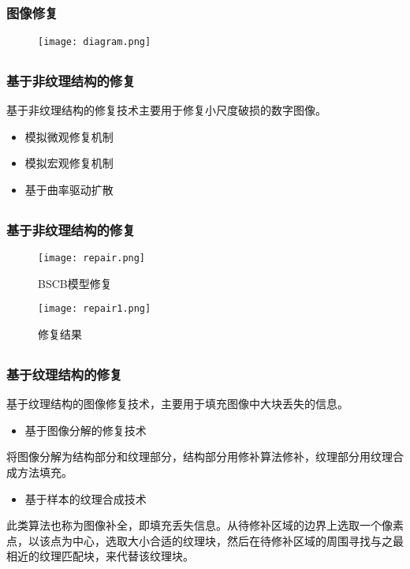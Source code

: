 \documentclass[notheorems,mathserif,table,compress]{beamer}  %
\begin{document}
\subsection{}
\begin{frame}
   \frametitle{图像修复}
   \begin{figure}[!ht]
   \centering
   \texttt{[image: diagram.png]}
   \end{figure}
\end{frame}

\subsection{}
\begin{frame}
   \frametitle{基于非纹理结构的修复}
   基于非纹理结构的修复技术主要用于修复小尺度破损的数字图像。 \\
   \begin{itemize}
   \item 模拟微观修复机制
   \item 模拟宏观修复机制
   \item 基于曲率驱动扩散
   \end{itemize}
\end{frame}

\subsection{}
\begin{frame}
   \frametitle{基于非纹理结构的修复}
   \begin{figure}
   \centering
   \texttt{[image: repair.png]}
   \caption{BSCB模型修复}
   \end{figure}
   \begin{figure}
   \centering
   \texttt{[image: repair1.png]}
   \caption{修复结果}
   \end{figure}   
\end{frame}

\subsection{}
\begin{frame}
   \frametitle{基于纹理结构的修复}
   基于纹理结构的图像修复技术，主要用于填充图像中大块丢失的信息。\\
   \begin{itemize}
   \item 基于图像分解的修复技术
   \end{itemize}
   \hspace{0.3in}将图像分解为结构部分和纹理部分，结构部分用修补算法修补，纹理部分用纹理合成方法填充。\\
   \begin{itemize}
   \item 基于样本的纹理合成技术
   \end{itemize}
   \hspace{0.3in}此类算法也称为图像补全，即填充丢失信息。从待修补区域的边界上选取一个像素点，以该点为中心，选取大小合适的纹理块，然后在待修补区域的周围寻找与之最相近的纹理匹配块，来代替该纹理块。
\end{frame}
\end{document}
